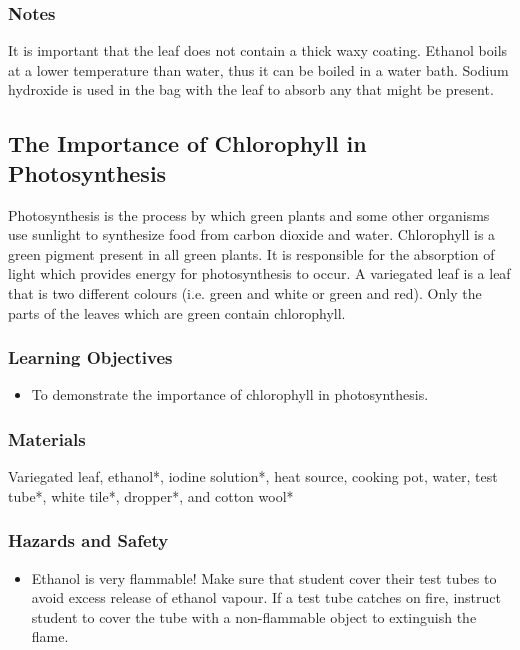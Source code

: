 \subsubsection*{Notes}
It is important that the leaf does not contain a thick waxy coating. Ethanol boils at a lower temperature than water, thus it can be boiled in a water bath. Sodium hydroxide is used in the bag with the leaf to absorb any  that might be present.

\subsection{The Importance of Chlorophyll in Photosynthesis}
Photosynthesis is the process by which green plants and some other organisms use sunlight to synthesize food from carbon dioxide and water. Chlorophyll is a green pigment present in all green plants. It is responsible for the absorption of light which provides energy for photosynthesis to occur. A variegated leaf is a leaf that is two different colours (i.e. green and white or green and red). Only the parts of the leaves which are green contain chlorophyll.

\subsubsection*{Learning Objectives}
\begin{itemize}
\item{To demonstrate the importance of chlorophyll in photosynthesis.}
\end{itemize}

\subsubsection*{Materials}
Variegated leaf, ethanol*, iodine solution*, heat source, cooking pot, water, test tube*, white tile*, dropper*, and cotton wool*

\subsubsection*{Hazards and Safety}
\begin{itemize}
\item{Ethanol is very flammable! Make sure that student cover their test tubes to avoid excess release of ethanol vapour. If a test tube catches on fire, instruct student to cover the tube with a non-flammable object to extinguish the flame.}
\end{itemize}


